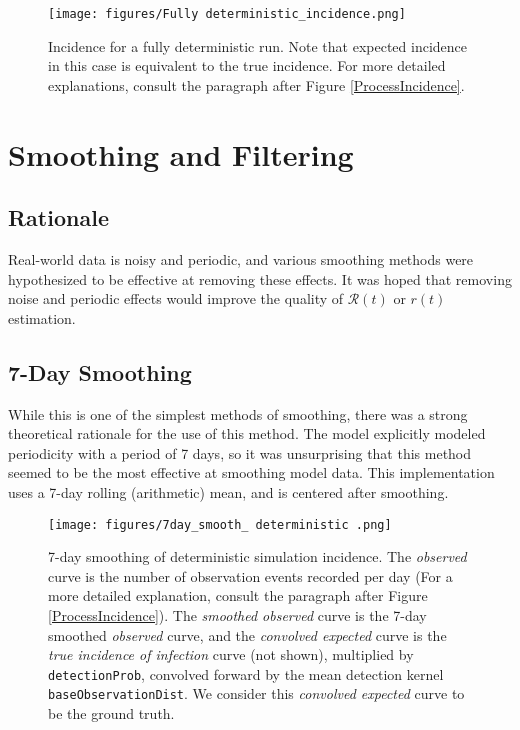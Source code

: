 \documentclass{article}
\newcommand{\nR}{\mathcal{R}}
\newcommand{\code}[1]{\texttt{#1}}
\begin{document}
\clearpage
\begin{figure}[h!]
    \centering
    \texttt{[image: figures/Fully deterministic\_incidence.png]}
    \caption{Incidence for a fully deterministic run. Note that expected incidence in this case is equivalent to the true incidence. For more detailed explanations, consult the paragraph after Figure \ref{ProcessIncidence}.}
\end{figure}


\section{Smoothing and Filtering}

\subsection{Rationale}
Real-world data is noisy and periodic, and various smoothing methods were hypothesized to be effective at removing these effects. It was hoped that removing noise and periodic effects would improve the quality of $\nR(t)$ or $r(t)$ estimation.

\subsection{7-Day Smoothing}
While this is one of the simplest methods of smoothing, there was a strong theoretical rationale for the use of this method. The model explicitly modeled periodicity with a period of 7 days, so it was unsurprising that this method seemed to be the most effective at smoothing model data. This implementation uses a 7-day rolling (arithmetic) mean, and is centered after smoothing.

\clearpage
\begin{figure}[h!]
    \centering
    \texttt{[image: figures/7day\_smooth\_ deterministic .png]}
    \caption{7-day smoothing of deterministic simulation incidence. The \emph{observed} curve is the number of observation events recorded per day (For a more detailed explanation, consult the paragraph after Figure \ref{ProcessIncidence}). The \emph {smoothed observed} curve is the 7-day smoothed \emph{observed} curve, and the \emph{convolved expected} curve is the \emph{true incidence of infection} curve (not shown), multiplied by \code{detectionProb}, convolved forward by the mean detection kernel \code{baseObservationDist}. We consider this \emph{convolved expected} curve to be the ground truth.} 
    \label{DeterministicSmoothing}
\end{figure}
\end{document}
